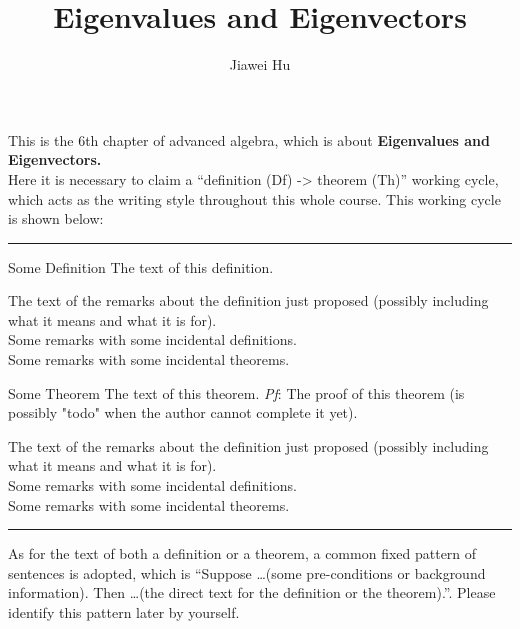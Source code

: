 \documentclass{article}
\title{\LARGE \textbf{Eigenvalues and Eigenvectors}}
\author{\large Jiawei Hu}
\begin{document}
\maketitle

This is the 6th chapter of advanced algebra, which is about \textbf{Eigenvalues and Eigenvectors.}\\
Here it is necessary to claim a ``definition (Df) -> theorem (Th)'' working cycle, which acts as the writing style throughout this whole course. This working cycle is shown below:

\noindent\rule{\textwidth}{2pt}
\begin{Df}{Some Definition}
    The text of this definition.
\end{Df}

\begin{Rmk}{}
    The text of the remarks about the definition just proposed (possibly including what it means and what it is for).\\
    \textcolor{Df}{Some remarks with some incidental definitions.}\\
    \textcolor{Th}{Some remarks with some incidental theorems.}
\end{Rmk}

\begin{Th}{Some Theorem}
    The text of this theorem.
    \tcblower
    \textit{Pf}: The proof of this theorem (is possibly "todo" when the author cannot complete it yet).
\end{Th}

\begin{Rmk}{}
    The text of the remarks about the definition just proposed (possibly including what it means and what it is for).\\
    \textcolor{Df}{Some remarks with some incidental definitions.}\\
    \textcolor{Th}{Some remarks with some incidental theorems.}
\end{Rmk}
\noindent\rule{\textwidth}{2pt}
As for the text of both a definition or a theorem, a common fixed pattern of sentences is adopted, which is ``Suppose \dots (some pre-conditions or background information). Then \dots (the direct text for the definition or the theorem).''. Please identify this pattern later by yourself. 
\end{document}
